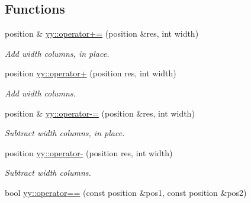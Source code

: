 \subsection*{Functions}
\begin{DoxyCompactItemize}
\item 
position \& \hyperlink{position_8hh_a211eb024d7e9666b07140040b079fccc}{yy\+::operator+=} (position \&res, int width)\hypertarget{position_8hh_a211eb024d7e9666b07140040b079fccc}{}\label{position_8hh_a211eb024d7e9666b07140040b079fccc}

\begin{DoxyCompactList}\small\item\em Add {\itshape width} columns, in place. \end{DoxyCompactList}\item 
position \hyperlink{position_8hh_a23f0f414cfca1fd11ff2b779ba018038}{yy\+::operator+} (position res, int width)\hypertarget{position_8hh_a23f0f414cfca1fd11ff2b779ba018038}{}\label{position_8hh_a23f0f414cfca1fd11ff2b779ba018038}

\begin{DoxyCompactList}\small\item\em Add {\itshape width} columns. \end{DoxyCompactList}\item 
position \& \hyperlink{position_8hh_a4cad44f80947f872e1bbf32fec9b7973}{yy\+::operator-\/=} (position \&res, int width)\hypertarget{position_8hh_a4cad44f80947f872e1bbf32fec9b7973}{}\label{position_8hh_a4cad44f80947f872e1bbf32fec9b7973}

\begin{DoxyCompactList}\small\item\em Subtract {\itshape width} columns, in place. \end{DoxyCompactList}\item 
position \hyperlink{position_8hh_af6d37eb09001871194885eb8d31fef92}{yy\+::operator-\/} (position res, int width)\hypertarget{position_8hh_af6d37eb09001871194885eb8d31fef92}{}\label{position_8hh_af6d37eb09001871194885eb8d31fef92}

\begin{DoxyCompactList}\small\item\em Subtract {\itshape width} columns. \end{DoxyCompactList}\item 
bool \hyperlink{position_8hh_a30a61b0569cd2c9ea4ae16eb4994c7b3}{yy\+::operator==} (const position \&pos1, const position \&pos2)\hypertarget{position_8hh_a30a61b0569cd2c9ea4ae16eb4994c7b3}{}\label{position_8hh_a30a61b0569cd2c9ea4ae16eb4994c7b3}


\end{DoxyCompactItemize}
